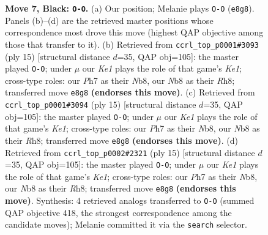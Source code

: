 \documentclass[11pt]{article}
\begin{document}
\begin{figure}[p]
\caption{\textbf{Move 7, Black: \texttt{O-O}.} (a) Our position; Melanie plays \texttt{O-O} (\texttt{e8g8}). Panels (b)--(d) are the retrieved master positions whose correspondence most drove this move (highest QAP objective among those that transfer to it). (b) Retrieved from \texttt{ccrl\_top\_p0001\#3093} (ply 15) [structural distance $d$=35, QAP obj=105]: the master played \texttt{O-O}; under $\mu$ our \emph{Ke1} plays the role of that game's \emph{Ke1}; cross-type roles: our \emph{P}h7 as their \emph{N}b8, our \emph{N}b8 as their \emph{R}h8; transferred move \texttt{e8g8} \textbf{(endorses this move)}. (c) Retrieved from \texttt{ccrl\_top\_p0001\#3094} (ply 15) [structural distance $d$=35, QAP obj=105]: the master played \texttt{O-O}; under $\mu$ our \emph{Ke1} plays the role of that game's \emph{Ke1}; cross-type roles: our \emph{P}h7 as their \emph{N}b8, our \emph{N}b8 as their \emph{R}h8; transferred move \texttt{e8g8} \textbf{(endorses this move)}. (d) Retrieved from \texttt{ccrl\_top\_p0002\#2321} (ply 15) [structural distance $d$=35, QAP obj=105]: the master played \texttt{O-O}; under $\mu$ our \emph{Ke1} plays the role of that game's \emph{Ke1}; cross-type roles: our \emph{P}h7 as their \emph{N}b8, our \emph{N}b8 as their \emph{R}h8; transferred move \texttt{e8g8} \textbf{(endorses this move)}. Synthesis: 4 retrieved analogs transferred to \texttt{O-O} (summed QAP objective 418, the strongest correspondence among the candidate moves); Melanie committed it via the \texttt{search} selector.}
\label{fig:thought-m13}
\end{figure}

\clearpage
\end{document}
